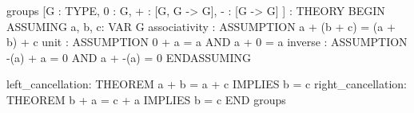groups [G : TYPE, 0 : G, + : [G, G -> G], - : [G -> G] ] : THEORY
  BEGIN
    ASSUMING
      a, b, c: VAR G
      associativity : ASSUMPTION  a + (b + c) = (a + b) + c
      unit : ASSUMPTION  0 + a = a AND a + 0 = a
      inverse : ASSUMPTION -(a) + a = 0 AND a + -(a) = 0
    ENDASSUMING

    left_cancellation: THEOREM a + b = a + c IMPLIES b = c
    right_cancellation: THEOREM b + a = c + a IMPLIES b = c
  END groups
